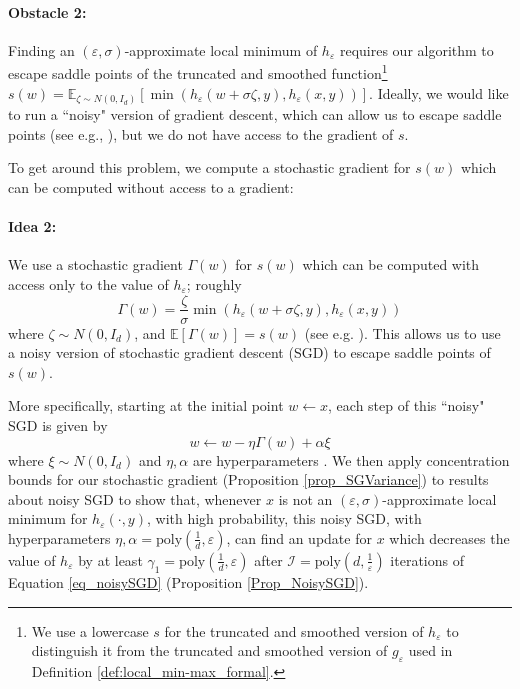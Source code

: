 \documentclass[11pt,letterpaper]{article}
\renewcommand{\epsilon}{\varepsilon}
\begin{document}
 \paragraph{Obstacle 2:}
Finding an $(\epsilon, \sigma)$-approximate local minimum of $h_\epsilon$ requires our algorithm to escape saddle points of the truncated and smoothed function\footnote{We use a lowercase $s$ for the truncated and smoothed version of $h_\epsilon$ to distinguish it from the truncated and smoothed version of $g_\epsilon$ used in Definition \ref{def:local_min-max_formal}.} $s(w) = \mathbb{E}_{\zeta \sim N(0,I_d)}[\min(h_\epsilon(w + \sigma \zeta, y), h_\epsilon(x ,y))]$. 
 Ideally, we would like to run a ``noisy" version of gradient descent, which can allow us to escape saddle points (see e.g., \cite{ge2015escaping}), but we do not have access to the gradient of $s$.
% 

 To get around this problem, we compute a stochastic gradient for $s(w)$ which can be computed without access to a gradient:
%
\paragraph{Idea 2:}
% 
We use a stochastic gradient $\Gamma(w)$ for $s(w)$ which can be computed with access only to the value of $h_\epsilon$; roughly
%
\begin{equation} \label{eq_gradient_free_SG}  
\Gamma(w) = \frac{\zeta}{\sigma} \min\left(h_\epsilon(w + \sigma \zeta, y), h_\epsilon(x ,y)\right)
\end{equation}
%
where $\zeta \sim N(0, I_d)$, and $\mathbb{E}[ \Gamma(w)] = s(w)$ (see e.g. \cite{flaxman2005online}). 
%
This allows us to use a noisy version of stochastic gradient descent (SGD) to escape saddle points of $s(w)$.%
%
%

More specifically, starting at the initial point $w \leftarrow x$, each step of this ``noisy" SGD is given by
%
\begin{equation}\label{eq_noisySGD}
w \leftarrow w -\eta \Gamma(w) + \alpha \xi
\end{equation}
%
where $\xi \sim N(0,I_d)$ and $\eta, \alpha$ are hyperparameters .
%
%
We then apply concentration bounds for our stochastic gradient (Proposition %
 \ref{prop_SGVariance}) to results about noisy SGD \cite{NonconvexOptimizationForML} to show that, whenever $x$ is not an $(\epsilon, \sigma)$-approximate local minimum for $h_\epsilon(\cdot,y)$, with high probability, this noisy SGD, with hyperparameters $\eta, \alpha = \mathrm{poly}\left(\frac{1}{d}, \epsilon\right)$, can find an update for $x$ which decreases the value of $h_\epsilon$ by at least $\gamma_1=\mathrm{poly}\left(\frac{1}{d},  \epsilon\right)$ after $\mathcal{I} =  \mathrm{poly}\left(d, \frac{1}{\epsilon}\right)$ iterations of Equation \eqref{eq_noisySGD}    (Proposition \ref{Prop_NoisySGD}).
%
%
\end{document}

